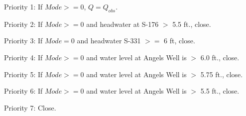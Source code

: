 
\begin{packed_items}
\item Priority 1: If $Mode>=0$, $Q = Q_{obs}$.
\item Priority 2: If $Mode>=0$ and headwater at S-176 $>$ 5.5 ft., close.
\item Priority 3: If $Mode=0$ and headwater S-331 $>=$ 6 ft, close.
\item Priority 4: If $Mode>=0$ and water level at Angels Well is $>$ 6.0 ft., close.
\item Priority 5: If $Mode>=0$ and water level at Angels Well is $>$ 5.75 ft., close.
\item Priority 6: If $Mode>=0$ and water level at Angels Well is $>$ 5.5 ft., close.
\item Priority 7: Close.
\end{packed_items}

